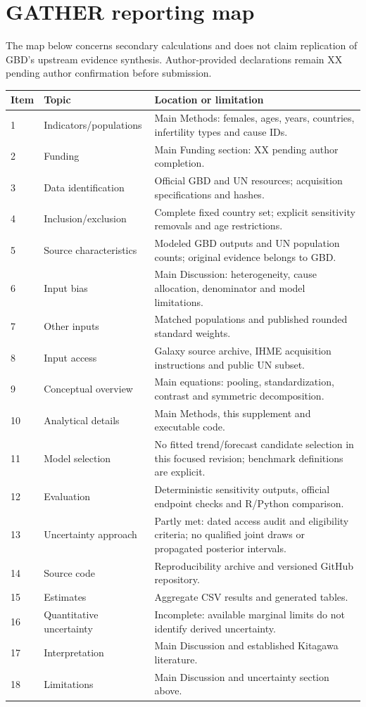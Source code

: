\documentclass[11pt,a4paper]{article}
\begin{document}
\section{GATHER reporting map}
The map below concerns secondary calculations and does not claim replication of GBD's upstream evidence synthesis. Author-provided declarations remain XX pending author confirmation before submission.
\small
\begin{longtable}{p{}p{}p{}}
\toprule Item & Topic & Location or limitation\\\midrule\endhead
1 & Indicators/populations & Main Methods: females, ages, years, countries, infertility types and cause IDs.\\
2 & Funding & Main Funding section: XX pending author completion.\\
3 & Data identification & Official GBD and UN resources; acquisition specifications and hashes.\\
4 & Inclusion/exclusion & Complete fixed country set; explicit sensitivity removals and age restrictions.\\
5 & Source characteristics & Modeled GBD outputs and UN population counts; original evidence belongs to GBD.\\
6 & Input bias & Main Discussion: heterogeneity, cause allocation, denominator and model limitations.\\
7 & Other inputs & Matched populations and published rounded standard weights.\\
8 & Input access & Galaxy source archive, IHME acquisition instructions and public UN subset.\\
9 & Conceptual overview & Main equations: pooling, standardization, contrast and symmetric decomposition.\\
10 & Analytical details & Main Methods, this supplement and executable code.\\
11 & Model selection & No fitted trend/forecast candidate selection in this focused revision; benchmark definitions are explicit.\\
12 & Evaluation & Deterministic sensitivity outputs, official endpoint checks and R/Python comparison.\\
13 & Uncertainty approach & Partly met: dated access audit and eligibility criteria; no qualified joint draws or propagated posterior intervals.\\
14 & Source code & Reproducibility archive and versioned GitHub repository.\\
15 & Estimates & Aggregate CSV results and generated tables.\\
16 & Quantitative uncertainty & Incomplete: available marginal limits do not identify derived uncertainty.\\
17 & Interpretation & Main Discussion and established Kitagawa literature.\\
18 & Limitations & Main Discussion and uncertainty section above.\\\bottomrule
\end{longtable}\normalsize
\end{document}
